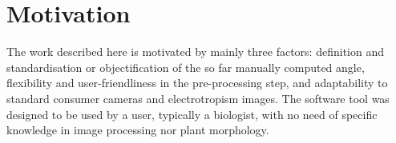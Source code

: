 \section{Motivation}
The work described here is motivated by mainly three factors: definition and standardisation or objectification of the so far manually computed angle, flexibility and user-friendliness in the pre-processing step, and adaptability to standard consumer cameras and electrotropism images. The software tool was designed to be used by a user, typically a biologist, with no need of specific knowledge in image processing nor plant morphology.


%


%
%
%


